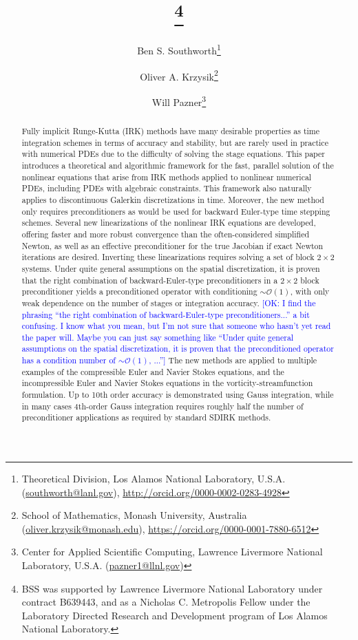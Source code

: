 \documentclass[review]{siamart}
\title{{\TheTitle}\thanks{BSS was supported by Lawrence Livermore National
      Laboratory under contract B639443, and as a Nicholas C. Metropolis Fellow
      under the Laboratory Directed Research and Development program of Los
      Alamos National Laboratory.
  }}
\author{Ben S. Southworth\thanks{Theoretical Division, Los Alamos National Laboratory,
    U.S.A. (\url{southworth@lanl.gov}),
    \url{http://orcid.org/0000-0002-0283-4928}}
    \and
    Oliver A. Krzysik\thanks{School of Mathematics, Monash University,
  	Australia (\url{oliver.krzysik@monash.edu}),
  	\url{https://orcid.org/0000-0001-7880-6512}}
  	\and
  	Will Pazner\thanks{Center for Applied Scientific Computing,
  	Lawrence Livermore National Laboratory,
    U.S.A. (\url{pazner1@llnl.gov})}
}
\newcommand{\OK}[1]{\textcolor{blue}{[OK: #1]}}
\begin{document}
\maketitle
\allowdisplaybreaks

\begin{abstract}
Fully implicit Runge-Kutta (IRK) methods have many desirable properties as time
integration schemes in terms of accuracy and stability, but are rarely used in
practice with numerical PDEs due to the difficulty of solving the stage equations.
This paper introduces a theoretical and algorithmic framework for the fast,
parallel solution of the nonlinear equations that arise from
IRK methods applied to nonlinear numerical PDEs, including PDEs with algebraic
constraints. This framework also naturally applies to discontinuous
Galerkin discretizations in time. Moreover, the new method only requires
preconditioners as would be used for backward Euler-type time stepping schemes.
Several new linearizations of the nonlinear IRK equations are developed,
offering faster and more robust convergence than the often-considered simplified
Newton, as well as an effective preconditioner for the true Jacobian if exact
Newton iterations are desired. Inverting these linearizations requires solving a
set of block $2\times 2$ systems. Under quite general assumptions on the
spatial discretization, it is proven that the right combination of
backward-Euler-type preconditioners in a $2\times 2$ block preconditioner yields
a preconditioned operator with conditioning $\sim\mathcal{O}(1)$, with only
weak dependence on the number of stages or integration accuracy. 
%
\OK{I find the phrasing ``the right combination of backward-Euler-type preconditioners...'' a bit confusing. I know what you mean, but I'm not sure that someone who hasn't yet read the paper will. Maybe you can just say something like ``Under quite general assumptions on the
spatial discretization, it is proven that the preconditioned operator has a condition number of $\sim\mathcal{O}(1)$, ...''} 
%
The new
methods are applied to multiple examples of the compressible Euler and Navier
Stokes equations, and the incompressible Euler and Navier Stokes equations
in the vorticity-streamfunction formulation. Up to 10th order accuracy is
demonstrated using Gauss integration, while in many cases 4th-order Gauss integration
requires roughly half the number of preconditioner applications as required
by standard SDIRK methods.
\end{abstract}


\end{document}
